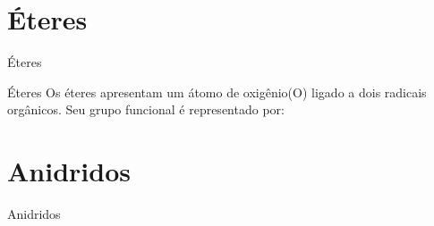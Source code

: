 \documentclass[presentation,professionalfonts,aspectratio=169]{beamer}
\begin{document}
\section{Éteres}
\label{sec:org678349a}

\begin{frame}[label={sec:org187b3c3}]{Éteres}
\begin{mybox}{Éteres}
Os éteres apresentam um átomo de oxigênio(O) ligado a dois radicais orgânicos.
Seu grupo funcional é representado por:

\begin{center}
\end{center}

\end{mybox}
\end{frame}





\section{Anidridos}
\label{sec:org40a8554}

\begin{frame}[label={sec:org14005fe}]{Anidridos}
\end{frame}
\end{document}
